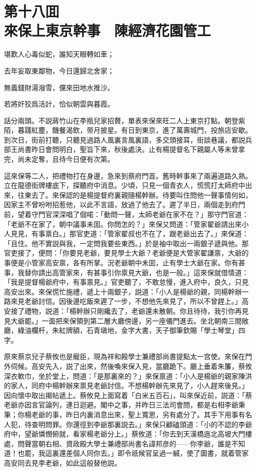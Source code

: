 
\chapter*{第十八囬　\\來保上東京幹事　陳經濟花園管工}


\begin{myquote}
堪歎人心毒似蛇，誰知天眼轉如車；

去年妄取東鄰物，今日還歸北舍家；

無義錢財湯潑雪，儻來田地水推沙。

若將奸狡爲活計，恰似朝雲與暮霞。
\end{myquote}

話分兩頭。不説蔣竹山在李瓶兒家招贅，單表來保來旺二人上東京打點。朝登紫陌，暮踐紅塵，饑餐渴飲，带月披星。有日到東京，進了萬壽城門，投旅店安歇。到次日，街前打聽，只聽見過路人風裏言風裏語，多交頭接耳，街談巷議，都説兵部王尚書昨日會問明白，聖旨下來，秋後處決。止有楊提督名下親屬人等未曾拿完，尚未定奪，且待今日便有次第。

這來保等二人，把禮物打在身邊，急來到蔡府門首。舊時幹事來了兩遍道路久熟。立在龍德街牌樓底下，探聽府中消息。少頃，只見一個青衣人，慌慌打太師府中出來，往東去了。來保認的是楊提督府裏親隨楊幹辦。待要叫住問他一聲事情何如，因家主不曾吩咐招惹他，以此不言語，放過了他去了。遲了半日，兩個走到府門前，望着守門官深深唱了個喏：「動問一聲，太師老爺在家不在？」那守門官道：「老爺不在家了，朝中議事未囬。你問怎的？」來保又問道：「管家翟爺請出來小人見見，有事禀白。」那官吏道：「管家翟叔也不在了，跟老爺出去了。」來保道：「且住。他不實説與我，一定問我要些東西。」於是袖中取出一兩銀子遞與他。那官吏接了，便問：「你要見老爺，要見學士大爺？老爺便是大管家翟謙禀，大爺的事便是小管家高安禀，各有所掌。況老爺朝中未囬，止有學士大爺在家。你有甚事，我替你請出高管家來，有甚事引你禀見大爺，也是一般。」這來保就借情道：「我是提督楊爺府中，有事禀見。」官吏聽了，不敢怠慢，進入府中，良久，只見高安出來。來保慌忙施禮，遞上十兩銀子，説道：「小人是楊爺的親，同楊幹辦一路來見老爺討信。因後邊吃飯來遲了一步，不想他先來見了，所以不曾趕上。」高安接了禮物，説道：「楊幹辦只剛纔去了，老爺還未散朝。你且待待，我引你再見見大爺罷。」一面把來保領到第二層大廳傍邊，另一座儀門進去。坐北朝南三間敞廳，綠油欄杆，朱紅牌額，石青塡地，金字大書，天子御筆欽賜「學士琴堂」四字。

原來蔡京兒子蔡攸也是寵臣，現為祥和殿學士兼禮部尚書提點太一宫使。來保在門外伺候。高安先入，説了出來，然後喚來保入見，當廳跪下。廳上垂着朱簾，蔡攸深衣軟巾，坐於堂上，問道：「是那裏來的？」來保禀道：「小人是楊爺的親家陳洪的家人，同府中楊幹辦來禀見老爺討信。不想楊幹辦先來見了，小人趕來後見。」因向懷中取出揭帖遞上。蔡攸見上面寫着「白米五百石」，叫來保近前，説道：「蔡老爺亦因言官論列，連日迴避。閣中之事，并昨日三法司會問，都是右相李爺秉筆；你楊老爺的事，昨日内裏消息出來，聖上寬恩，另有處分了。其手下用事有名人犯，待查明問罪。你還徑到李爺那裏説去。」來保只顧磕頭道：「小的不認的李爺府中，望爺憐憫俯就，看家楊老爺分上。」蔡攸道：「你去到天漢橋迤北高坡大門樓處，問聲當朝右相、資政殿大學士兼禮部尚書名諱邦彦的——你李爺，誰是不知道！也罷，我這裏還差個人同你去。」即令祇候官呈過一緘，使了圖書，就着管家高安同去見李老爺，如此這般替他説。

